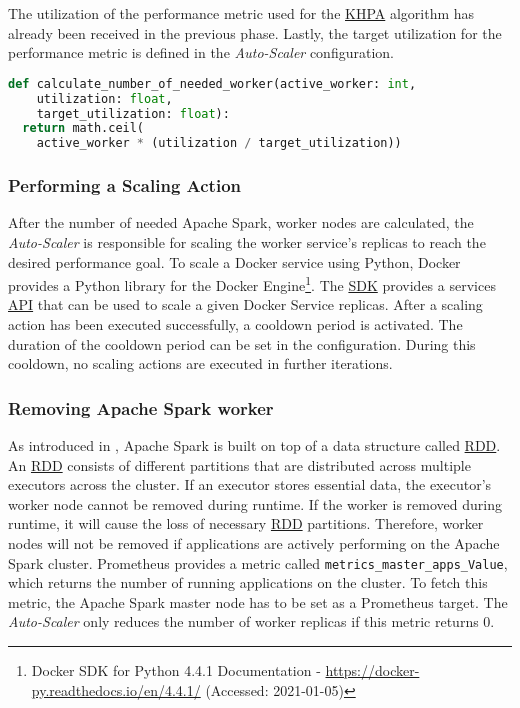 The utilization of the performance metric  used for the \hyperlink{abbr:khpa}{KHPA} algorithm has already been received in the previous phase. Lastly, the target utilization for the performance metric is defined in the \textit{Auto-Scaler} configuration. 
\begin{lstlisting}[label=lst:06_auto-scaler_plan_khpa, caption=KHPA implementation using Python 3.8, language=Python]
def calculate_number_of_needed_worker(active_worker: int,
    utilization: float,
    target_utilization: float):
  return math.ceil(
    active_worker * (utilization / target_utilization))
\end{lstlisting}


\subsubsection{Performing a Scaling Action}
After the number of needed Apache Spark, worker nodes are calculated, the \textit{Auto-Scaler} is responsible for scaling the worker service's replicas to reach the desired performance goal.
To scale a Docker service using Python, Docker provides a Python library for the Docker Engine\footnote{Docker SDK for Python 4.4.1 Documentation - \url{https://docker-py.readthedocs.io/en/4.4.1/} (Accessed: 2021-01-05)}. 
The \hyperlink{abbr:sdk}{SDK} provides a services \hyperlink{abbr:api}{API} that can be used to scale a given Docker Service replicas.
After a scaling action has been executed successfully, a cooldown period is activated. The duration of the cooldown period can be set in the configuration. During this cooldown, no scaling actions are executed in further iterations.


\subsubsection{Removing Apache Spark worker}
As introduced in , Apache Spark is built on top of a data structure called \hyperlink{abbr:rdd}{RDD}. An \hyperlink{abbr:rdd}{RDD} consists of different partitions that are distributed across multiple executors across the cluster.
If an executor stores essential data, the executor's worker node cannot be removed during runtime. If the worker is removed during runtime, it will cause the loss of necessary \hyperlink{abbr:rdd}{RDD} partitions.
Therefore, worker nodes will not be removed if applications are actively performing on the Apache Spark cluster.
Prometheus provides a metric called \texttt{metrics\_master\_apps\_Value}, which returns the number of running applications on the cluster. To fetch this metric, the Apache Spark master node has to be set as a Prometheus target.
The \textit{Auto-Scaler} only reduces the number of worker replicas if this metric returns 0.


